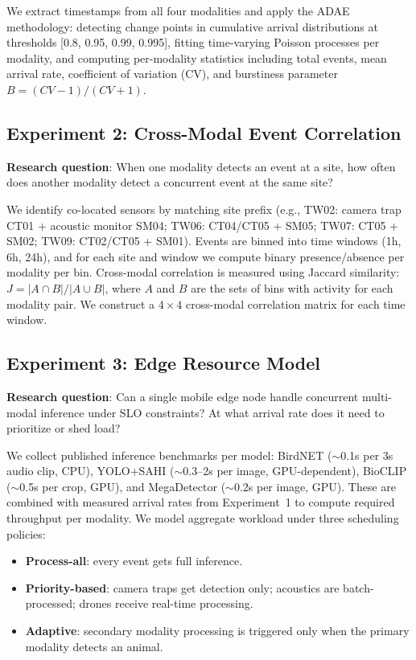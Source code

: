\documentclass[letterpaper,twocolumn,10pt]{article}
\begin{document}
We extract timestamps from all four modalities and apply the ADAE methodology: detecting change points in cumulative arrival distributions at thresholds [0.8, 0.95, 0.99, 0.995], fitting time-varying Poisson processes per modality, and computing per-modality statistics including total events, mean arrival rate, coefficient of variation (CV), and burstiness parameter $B = (CV - 1)/(CV + 1)$.

\subsection{Experiment 2: Cross-Modal Event Correlation}
\label{sec:exp2}

\textbf{Research question}: When one modality detects an event at a site, how often does another modality detect a concurrent event at the same site?

We identify co-located sensors by matching site prefix (e.g., TW02: camera trap CT01 + acoustic monitor SM04; TW06: CT04/CT05 + SM05; TW07: CT05 + SM02; TW09: CT02/CT05 + SM01). Events are binned into time windows (1h, 6h, 24h), and for each site and window we compute binary presence/absence per modality per bin. Cross-modal correlation is measured using Jaccard similarity: $J = |A \cap B| / |A \cup B|$, where $A$ and $B$ are the sets of bins with activity for each modality pair. We construct a $4 \times 4$ cross-modal correlation matrix for each time window.

\subsection{Experiment 3: Edge Resource Model}
\label{sec:exp3}

\textbf{Research question}: Can a single mobile edge node handle concurrent multi-modal inference under SLO constraints? At what arrival rate does it need to prioritize or shed load?

We collect published inference benchmarks per model: BirdNET ($\sim$0.1s per 3s audio clip, CPU), YOLO+SAHI ($\sim$0.3--2s per image, GPU-dependent), BioCLIP ($\sim$0.5s per crop, GPU), and MegaDetector ($\sim$0.2s per image, GPU). These are combined with measured arrival rates from Experiment~1 to compute required throughput per modality. We model aggregate workload under three scheduling policies:
\begin{itemize}
    \item \textbf{Process-all}: every event gets full inference.
    \item \textbf{Priority-based}: camera traps get detection only; acoustics are batch-processed; drones receive real-time processing.
    \item \textbf{Adaptive}: secondary modality processing is triggered only when the primary modality detects an animal.
\end{itemize}
\end{document}
